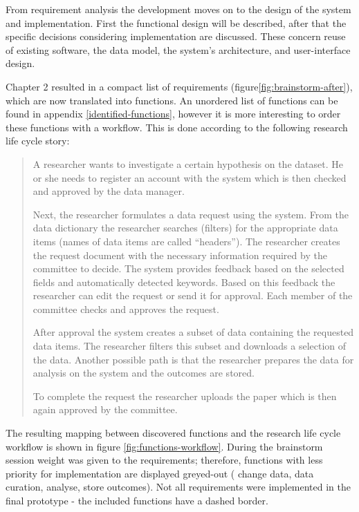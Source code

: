 From requirement analysis the development moves on to the design of the system and implementation.
First the functional design will be described, after that the specific decisions considering implementation are discussed.
These concern reuse of existing software, the data model, the system's architecture, and user-interface design.

Chapter 2 resulted in a compact list of requirements (figure\ref{fig:brainstorm-after}), which are now translated into functions.
An unordered list of functions can be found in appendix \ref{identified-functions}, however it is more interesting to order these functions with a workflow.
This is done according to the following research life cycle story:

\begin{quotation}
	\noindent{} A researcher wants to investigate a certain hypothesis on the \project{} dataset.
	He or she needs to register an account with the system which is then checked and approved by the data manager.
	
	Next, the researcher formulates a data request using the system.
	From the data dictionary the researcher searches (filters) for the appropriate data items (names of data items are called ``headers'').
	The researcher creates the request document with the necessary information required by the committee to decide.
	The system provides feedback based on the selected fields and automatically detected keywords.
	Based on this feedback the researcher can edit the request or send it for approval.
	Each member of the committee checks and approves the request.
	
	After approval the system creates a subset of \project{} data containing the requested data items.
	The researcher filters this subset and downloads a selection of the data.
	Another possible path is that the researcher prepares the data for analysis on the system and the outcomes are stored.
	
	To complete the request the researcher uploads the paper which is then again approved by the committee.
\end{quotation}

\noindent{}The resulting mapping between discovered functions and the research life cycle workflow is shown in figure \ref{fig:functions-workflow}.
During the brainstorm session weight was given to the requirements; therefore, functions with less priority for  implementation are displayed greyed-out (\ie{} change data, data curation, analyse, store outcomes).
Not all requirements were implemented in the final prototype - the included functions  have a dashed border.


